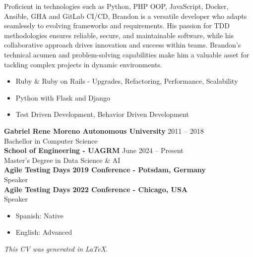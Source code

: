 Proficient in technologies such as Python, PHP OOP, JavaScript, Docker, Ansible, GHA and GitLab CI/CD, Brandon is a versatile developer who adapts seamlessly to evolving frameworks and requirements. His passion for TDD methodologies ensures reliable, secure, and maintainable software, while his collaborative approach drives innovation and success within teams. Brandon’s technical acumen and problem-solving capabilities make him a valuable asset for tackling complex projects in dynamic environments.

\begin{itemize}
    \setlength{\itemsep}{0pt} %
    \setlength{\topsep}{0pt}  %
    \setlength{\parsep}{0pt}  %
    \setlength{\partopsep}{0pt} %
    \item Ruby \& Ruby on Rails - Upgrades, Refactoring, Performance, Scalability
    \item Python with Flask and Django
    \item Test Driven Development, Behavior Driven Development
\end{itemize}

\begingroup

% 






\endgroup

\textbf{Gabriel Rene Moreno Autonomous University} \hfill 2011 -- 2018\\
Bachellor in Computer Science\\

\textbf{School of Engineering - UAGRM} \hfill June 2024 -- Present\\
Master's Degree in Data Science \& AI\\

\textbf{Agile Testing Days 2019 Conference - Potsdam, Germany}\\
Speaker\\
\textbf{Agile Testing Days 2022 Conference - Chicago, USA}\\
Speaker\\

\begin{itemize}
    \item Spanish: Native
    \item English: Advanced
\end{itemize}

\vfill
\begin{center}
    \textit{This CV was generated in LaTeX.}
\end{center}


